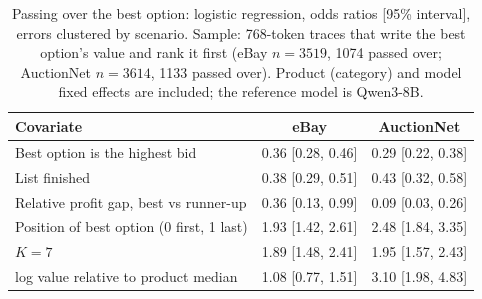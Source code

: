 \begin{table}[t]
\caption{Passing over the best option: logistic regression, odds ratios [95\% interval], errors clustered by scenario. Sample: 768-token traces that write the best option's value and rank it first (eBay $n=3519$, 1074 passed over; AuctionNet $n=3614$, 1133 passed over). Product (category) and model fixed effects are included; the reference model is Qwen3-8B.}
\label{tab:reg}
\small
\centering

\begin{tabular}{lcc}
\toprule
Covariate & eBay & AuctionNet \\
\midrule
Best option is the highest bid & 0.36 [0.28, 0.46] & 0.29 [0.22, 0.38] \\
List finished & 0.38 [0.29, 0.51] & 0.43 [0.32, 0.58] \\
Relative profit gap, best vs runner-up & 0.36 [0.13, 0.99] & 0.09 [0.03, 0.26] \\
Position of best option (0 first, 1 last) & 1.93 [1.42, 2.61] & 2.48 [1.84, 3.35] \\
$K=7$ & 1.89 [1.48, 2.41] & 1.95 [1.57, 2.43] \\
log value relative to product median & 1.08 [0.77, 1.51] & 3.10 [1.98, 4.83] \\
\bottomrule
\end{tabular}
\end{table}
